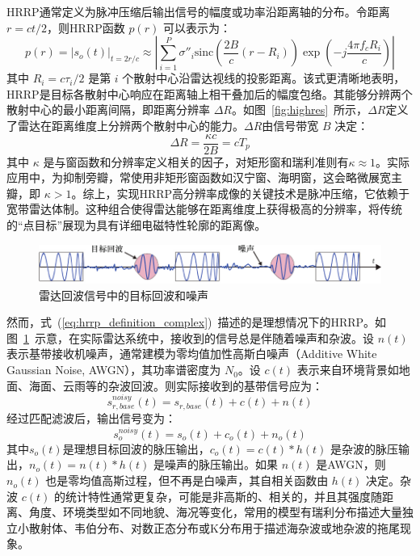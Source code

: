HRRP通常定义为脉冲压缩后输出信号的幅度或功率沿距离轴的分布。令距离 $r = ct/2$，则HRRP函数 $p(r)$ 可以表示为：
\begin{equation}
    p(r) = |s_o(t)|_{t=2r/c} \approx \left| \sum_{i=1}^{P} \sigma''_i \text{sinc}\left(\frac{2B}{c}(r - R_i)\right) \exp(-j \frac{4\pi f_c R_i}{c}) \right|
    \label{eq:hrrp_definition_complex}
\end{equation}
其中 $R_i = c\tau_i/2$ 是第 $i$ 个散射中心沿雷达视线的投影距离。该式更清晰地表明，HRRP是目标各散射中心响应在距离轴上相干叠加后的幅度包络。其能够分辨两个散射中心的最小距离间隔，即距离分辨率 $\Delta R$。如图~\ref{fig:highres}~所示，$\Delta R$定义了雷达在距离维度上分辨两个散射中心的能力。$\Delta R$由信号带宽 $B$ 决定：
\begin{equation}
    \Delta R = \frac{\kappa c}{2B} = cT_p
    \label{eq:range_resolution_kappa}
\end{equation}
其中 $\kappa$ 是与窗函数和分辨率定义相关的因子，对矩形窗和瑞利准则有$\kappa \approx 1$。实际应用中，为抑制旁瓣，常使用非矩形窗函数如汉宁窗、海明窗，这会略微展宽主瓣，即 $\kappa > 1$。综上，实现HRRP高分辨率成像的关键技术是脉冲压缩，它依赖于宽带雷达体制。这种组合使得雷达能够在距离维度上获得极高的分辨率，将传统的“点目标”展现为具有详细电磁特性轮廓的距离像。

\begin{figure}[h]
    \centering
    \includegraphics[width=\linewidth]{figures/noise_axis.pdf}
    \caption{雷达回波信号中的目标回波和噪声}
    \label{fig:noise_axis}
\end{figure}

然而，式~(\ref{eq:hrrp_definition_complex})~描述的是理想情况下的HRRP。如图~\ref{fig:noise_axis}~示意，在实际雷达系统中，接收到的信号总是伴随着噪声和杂波。设 $n(t)$ 表示基带接收机噪声，通常建模为零均值加性高斯白噪声（Additive White Gaussian Noise, AWGN），其功率谱密度为 $N_0$。设 $c(t)$ 表示来自环境背景如地面、海面、云雨等的杂波回波。则实际接收到的基带信号应为：
\begin{equation}
    s_{r,base}^{noisy}(t) = s_{r,base}(t) + c(t) + n(t)
    \label{eq:received_noisy}
\end{equation}
经过匹配滤波后，输出信号变为：
\begin{equation}
    s_o^{noisy}(t) = s_o(t) + c_o(t) + n_o(t)
    \label{eq:output_noisy}
\end{equation}
其中$s_o(t)$是理想目标回波的脉压输出，$c_o(t) = c(t) * h(t)$ 是杂波的脉压输出，$n_o(t) = n(t) * h(t)$ 是噪声的脉压输出。如果 $n(t)$ 是AWGN，则 $n_o(t)$ 也是零均值高斯过程，但不再是白噪声，其自相关函数由 $h(t)$ 决定。杂波 $c(t)$ 的统计特性通常更复杂，可能是非高斯的、相关的，并且其强度随距离、角度、环境类型如不同地貌、海况等变化，常用的模型有瑞利分布描述大量独立小散射体、韦伯分布、对数正态分布或K分布用于描述海杂波或地杂波的拖尾现象。


